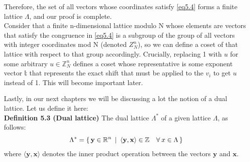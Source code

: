 Therefore, the set of all vectors whose coordinates satisfy \eqref{eq5.4} forms a finite lattice $\Lambda$, and our proof is complete.
\\

 Consider that a finite n-dimensional lattice modulo N whose elements are vectors that satisfy the congruence in \eqref{eq5.4} is a subgroup of the group of all vectors with integer coordinates mod N (denoted $Z_N^n$), so we can define a coset of that lattice with respect to that group accordingly. Crucially, replacing 1 with $u$ for some arbitrary $u \in \mathbb{Z}^n_N$ defines a coset whose representative is some exponent vector $\mathbb{t}$ that represents the exact shift that must be applied to the $v_i$ to get $u$ instead of 1. This will become important later.
 
Lastly, in our next chapters we will be discussing a lot the notion of a dual lattice. Let us define it here:\\

\textbf{Definition 5.3 (Dual lattice)} The dual lattice $\Lambda^*$ of a given lattice $\Lambda$, as follows:
\begin{equation}
    \Lambda^* = \set{\mathbf{y}\in \mathbb{R}^n \: | \: \langle \mathbf{y,x} \rangle \in \mathbb{Z} \quad \forall \: x \in \Lambda}
\end{equation}
where $\langle \mathbf{y,x} \rangle$ denotes the inner product operation between the vectors $\mathbf{y}$ and $\mathbf{x}$.

